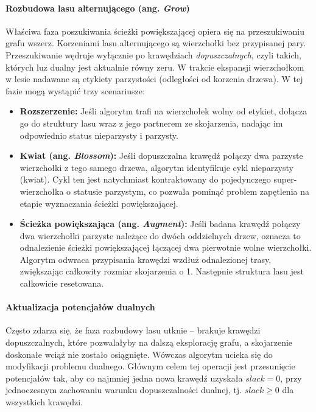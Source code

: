 \documentclass{article}
\theoremstyle{definition}
\theoremstyle{plain}
\theoremstyle{remark}
\begin{document}
\paragraph{Rozbudowa lasu alternującego (ang. \textit{Grow})}
Właściwa faza poszukiwania ścieżki powiększającej opiera się na przeszukiwaniu grafu wszerz. Korzeniami lasu alternującego są wierzchołki bez przypisanej pary. Przeszukiwanie wędruje wyłącznie po krawędziach \textit{dopuszczalnych}, czyli takich, których luz dualny jest aktualnie równy zeru. W trakcie ekspansji wierzchołkom w lesie nadawane są etykiety parzystości (odległości od korzenia drzewa). W tej fazie mogą wystąpić trzy scenariusze:
\begin{itemize}
    \item \textbf{Rozszerzenie:} Jeśli algorytm trafi na wierzchołek wolny od etykiet, dołącza go do struktury lasu wraz z jego partnerem ze skojarzenia, nadając im odpowiednio status nieparzysty i parzysty.
    \item \textbf{Kwiat (ang. \textit{Blossom}):} Jeśli dopuszczalna krawędź połączy dwa parzyste wierzchołki z tego samego drzewa, algorytm identyfikuje cykl nieparzysty (kwiat). Cykl ten jest natychmiast kontraktowany do pojedynczego super-wierzchołka o statusie parzystym, co pozwala pominąć problem zapętlenia na etapie wyznaczania ścieżki powiększającej.
    \item \textbf{Ścieżka powiększająca (ang. \textit{Augment}):} Jeśli badana krawędź połączy dwa wierzchołki parzyste należące do dwóch oddzielnych drzew, oznacza to odnalezienie ścieżki powiększającej łączącej dwa pierwotnie wolne wierzchołki. Algorytm odwraca przypisania krawędzi wzdłuż odnalezionej trasy, zwiększając całkowity rozmiar skojarzenia o 1. Następnie struktura lasu jest całkowicie resetowana.
\end{itemize}

\paragraph{Aktualizacja potencjałów dualnych}
Często zdarza się, że faza rozbudowy lasu utknie -- brakuje krawędzi dopuszczalnych, które pozwalałyby na dalszą eksplorację grafu, a skojarzenie doskonałe wciąż nie zostało osiągnięte. Wówczas algorytm ucieka się do modyfikacji problemu dualnego. Głównym celem tej operacji jest przesunięcie potencjałów tak, aby co najmniej jedna nowa krawędź uzyskała $slack = 0$, przy jednoczesnym zachowaniu warunku dopuszczalności dualnej, tj. $slack \ge 0$ dla wszystkich krawędzi.
\end{document}
